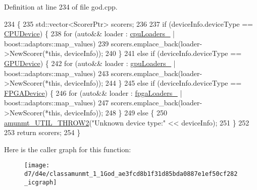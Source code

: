 Definition at line 234 of file god.\+cpp.


\begin{DoxyCode}
234                                                                        \{
235   std::vector<ScorerPtr> scorers;
236 
237   \textcolor{keywordflow}{if} (deviceInfo.deviceType == \hyperlink{namespaceamunmt_a0f0dad0deb73c5a4c574d8c63833ab17aafe1036ae66e30a8f082bda43072162a}{CPUDevice}) \{
238     \textcolor{keywordflow}{for} (\textcolor{keyword}{auto}&& loader : \hyperlink{classamunmt_1_1God_aa18f86519617baf112214a7564a7bae0}{cpuLoaders\_} | boost::adaptors::map\_values)
239       scorers.emplace\_back(loader->NewScorer(*\textcolor{keyword}{this}, deviceInfo));
240   \}
241   \textcolor{keywordflow}{else} \textcolor{keywordflow}{if} (deviceInfo.deviceType == \hyperlink{namespaceamunmt_a0f0dad0deb73c5a4c574d8c63833ab17a2ff3f7952956ae21ddcfa3564fe4de5f}{GPUDevice}) \{
242     \textcolor{keywordflow}{for} (\textcolor{keyword}{auto}&& loader : \hyperlink{classamunmt_1_1God_a2a713e550f5ee7296e7a66bd0b98339d}{gpuLoaders\_} | boost::adaptors::map\_values)
243       scorers.emplace\_back(loader->NewScorer(*\textcolor{keyword}{this}, deviceInfo));
244   \}
245   \textcolor{keywordflow}{else} \textcolor{keywordflow}{if} (deviceInfo.deviceType == \hyperlink{namespaceamunmt_a0f0dad0deb73c5a4c574d8c63833ab17a1fd21d75952419f8b1ab988f28f747fc}{FPGADevice}) \{
246     \textcolor{keywordflow}{for} (\textcolor{keyword}{auto}&& loader : \hyperlink{classamunmt_1_1God_a59b113c68d8b05dfd18b8a48ed9fa180}{fpgaLoaders\_} | boost::adaptors::map\_values)
247       scorers.emplace\_back(loader->NewScorer(*\textcolor{keyword}{this}, deviceInfo));
248   \}
249   \textcolor{keywordflow}{else} \{
250   \hyperlink{exception_8h_a620a250f8b1bb0d664281ec2eb1b5b41}{amunmt\_UTIL\_THROW2}(\textcolor{stringliteral}{"Unknown device type:"} << deviceInfo);
251   \}
252 
253   \textcolor{keywordflow}{return} scorers;
254 \}
\end{DoxyCode}


Here is the caller graph for this function\+:
\nopagebreak
\begin{figure}[H]
\begin{center}
\leavevmode
\texttt{[image: d7/d4e/classamunmt\_1\_1God\_ae3fcd8b1f31d85bda0887e1ef50cf282\_icgraph]}
\end{center}
\end{figure}


